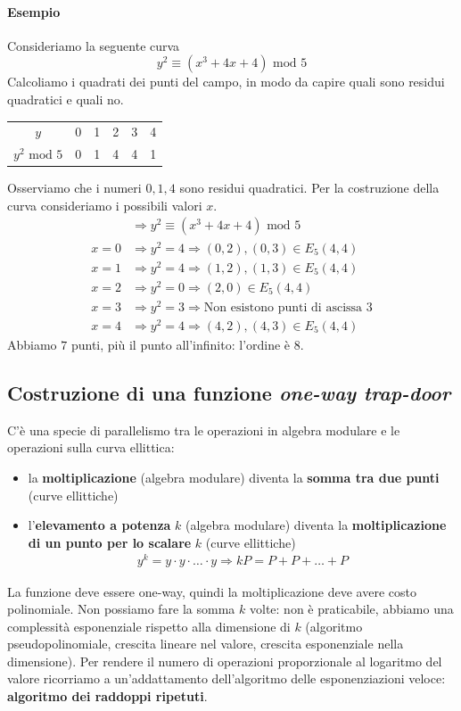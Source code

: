 \paragraph{Esempio} Consideriamo la seguente curva
$$y^2\equiv (x^3+4x+4) \text{ mod }5$$
Calcoliamo i quadrati dei punti del campo, in modo da capire quali sono residui quadratici e quali no.
\begin{center}
	\begin{tabular}{c|c c c c c}
		\hline
		$y$ & 0&1&2&3&4  \\
		$y^2 \text{ mod }5$ & 0&1&4&4&1  \\
	\end{tabular}
\end{center}
Osserviamo che i numeri $0,1,4$ sono residui quadratici. Per la costruzione della curva consideriamo i possibili valori $x$.
\begin{align*}
	& \Longrightarrow y^2\equiv (x^3+4x+4) \text{ mod }5\\
	x=0 &\Longrightarrow y^2=4 \Longrightarrow (0,2), (0,3) \in E_5(4,4)\\
	x=1 &\Longrightarrow y^2=4 \Longrightarrow (1,2),(1,3) \in E_5(4,4)\\
	x=2 &\Longrightarrow y^2=0 \Longrightarrow (2,0) \in E_5(4,4)\\
	x=3 &\Longrightarrow y^2=3 \Longrightarrow \text{Non esistono punti di ascissa $3$}\\
	x=4 &\Longrightarrow y^2=4 \Longrightarrow (4,2),(4,3) \in E_5(4,4)
\end{align*}
Abbiamo $7$ punti, più il punto all'infinito: l'ordine è $8$.
\subsection{Costruzione di una funzione \emph{one-way trap-door}}
C'è una specie di parallelismo tra le operazioni in algebra modulare e le operazioni sulla curva ellittica:
\begin{itemize}
    \item la \textbf{moltiplicazione} (algebra modulare) diventa la \textbf{somma tra due punti} (curve ellittiche)
    \item l'\textbf{elevamento a potenza} $k$ (algebra modulare) diventa la \textbf{moltiplicazione di un punto per lo scalare} $k$ (curve ellittiche)
    \begin{align*}y^k=y \cdot y \cdot \dots \cdot y \Longrightarrow kP=P+P+\dots+P\end{align*}
\end{itemize}
La funzione deve essere one-way, quindi la moltiplicazione deve avere costo polinomiale. Non possiamo fare la somma $k$ volte: non è praticabile, abbiamo una complessità esponenziale rispetto alla dimensione di $k$ (algoritmo pseudopolinomiale, crescita lineare nel valore, crescita esponenziale nella dimensione). Per rendere il numero di operazioni proporzionale al logaritmo del valore ricorriamo a un'addattamento dell'algoritmo delle esponenziazioni veloce: \textbf{algoritmo dei raddoppi ripetuti}.

